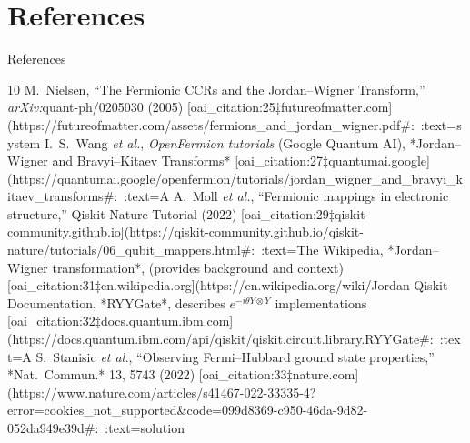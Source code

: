 \documentclass{beamer}
\begin{document}
\section{References}
\begin{frame}[allowframebreaks]{References}
\footnotesize
\begin{thebibliography}{10}
\bibitem M.\ Nielsen, “The Fermionic CCRs and the Jordan–Wigner Transform,” {\it arXiv:}quant-ph/0205030 (2005) [oai_citation:25‡futureofmatter.com](https://futureofmatter.com/assets/fermions_and_jordan_wigner.pdf#:~:text=system%
\bibitem I.\ S.\ Wang {\it et al.}, {\it OpenFermion tutorials} (Google Quantum AI), *Jordan–Wigner and Bravyi–Kitaev Transforms* [oai_citation:27‡quantumai.google](https://quantumai.google/openfermion/tutorials/jordan_wigner_and_bravyi_kitaev_transforms#:~:text=A%
\bibitem A.\ Moll {\it et al.}, “Fermionic mappings in electronic structure,” Qiskit Nature Tutorial (2022) [oai_citation:29‡qiskit-community.github.io](https://qiskit-community.github.io/qiskit-nature/tutorials/06_qubit_mappers.html#:~:text=The%
\bibitem Wikipedia, *Jordan–Wigner transformation*, (provides background and context) [oai_citation:31‡en.wikipedia.org](https://en.wikipedia.org/wiki/Jordan%
\bibitem Qiskit Documentation, *RYYGate*, describes $e^{-i\theta Y\otimes Y}$ implementations [oai_citation:32‡docs.quantum.ibm.com](https://docs.quantum.ibm.com/api/qiskit/qiskit.circuit.library.RYYGate#:~:text=A%
\bibitem S.\ Stanisic {\it et al.}, “Observing Fermi–Hubbard ground state properties,” *Nat.\ Commun.* 13, 5743 (2022) [oai_citation:33‡nature.com](https://www.nature.com/articles/s41467-022-33335-4?error=cookies_not_supported&code=099d8369-c950-46da-9d82-052da949e39d#:~:text=solution%
\end{thebibliography}
\end{frame}
\end{document}

